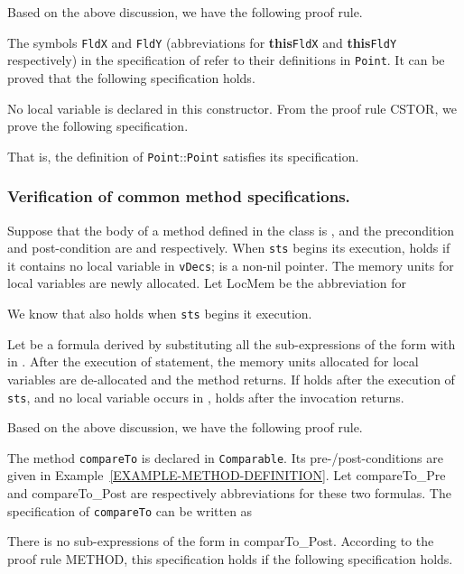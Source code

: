 \documentclass[fleqn]{llncs}
\begin{document}
Based on the above discussion, we have the following proof rule.


\begin{example}
The symbols
\texttt{FldX} and \texttt{FldY} (abbreviations for \textbf{this}\fldacc\texttt{FldX} and \textbf{this}\fldacc\texttt{FldY} respectively)
in the specification of  refer to their definitions in \texttt{Point}. It can be proved that the following specification holds.

No local variable is declared in this constructor. From the proof rule CSTOR, we prove the following specification.

That is, the definition of \texttt{Point}\mbox{::}\texttt{Point} satisfies its specification.
\hfill
\end{example}

\subsubsection{Verification of common method specifications.}
Suppose that the body of a method  defined in the class  is ,
and the precondition and post-condition are  and  respectively.
When \texttt{sts} begins its execution,  holds if it contains no local variable in \texttt{vDecs};  is
a non-nil pointer. The memory units for local variables are newly allocated.
Let \textsf{LocMem} be the abbreviation for
    
We know that  also holds when \texttt{sts} begins it execution.


Let  be a formula derived by substituting all the sub-expressions of the form  with  in .
After the execution of statement, the memory units allocated for local variables are de-allocated and the method returns.
If  holds after the execution of \texttt{sts}, and no local variable occurs in ,
 holds after the invocation returns.


Based on the above discussion, we have the following proof rule.


\begin{example}
The method \texttt{compareTo} is declared in \texttt{Comparable}. Its pre-/post-conditions are given in Example~\ref{EXAMPLE-METHOD-DEFINITION}.
Let \textsf{compareTo\_Pre} and \textsf{compareTo\_Post} are respectively abbreviations for these two formulas. The specification
of \texttt{compareTo} can be written as

There is no sub-expressions of the form  in \textsf{comparTo\_Post}.
According to the proof rule METHOD, this specification holds if the following specification holds.

\hfill
\end{example}
\end{document}
